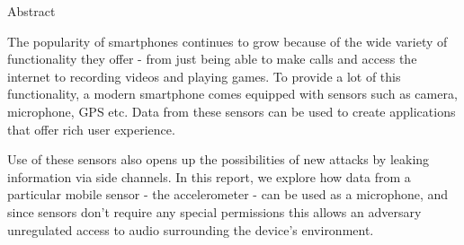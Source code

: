 \begin{center}
\LARGE{Abstract}
\end{center}

\vspace{0.5in}

The popularity of smartphones continues to grow because of the wide variety of functionality they offer - from just being able to make calls and access the internet to recording videos and playing games. To provide a lot of this functionality, a modern smartphone comes equipped with sensors such as camera, microphone, GPS etc. Data from these sensors can be used to create applications that offer rich user experience.

Use of these sensors also opens up the possibilities of new attacks by leaking information via side channels. In this report, we explore how data from a particular mobile sensor - the accelerometer - can be used as a microphone, and since sensors don't require any special permissions this allows an adversary unregulated access to audio surrounding the device's environment.
